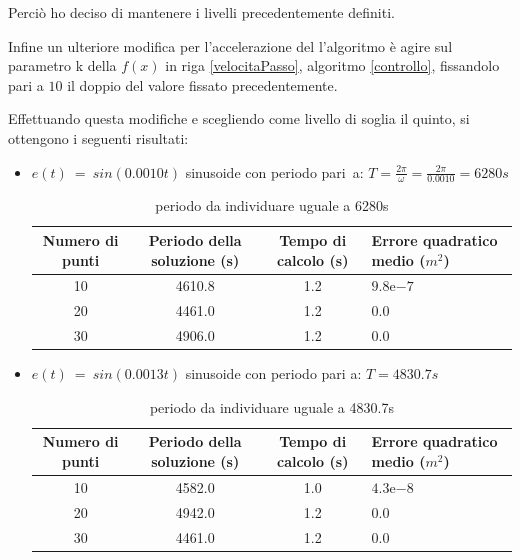 \documentclass[a4paper,12pt]{report}
\newcommand{\expnumber}[2]{{#1}\mathrm{e}{#2}}
\begin{document}
Perciò ho deciso di mantenere i livelli precedentemente definiti.

Infine un ulteriore modifica per l'accelerazione del l'algoritmo è agire sul parametro k della $f(x)$ in riga \ref{velocitaPasso}, algoritmo \ref{controllo}, fissandolo pari a $10$ il doppio del valore fissato precedentemente.

Effettuando questa modifiche e scegliendo come livello di soglia il quinto, si ottengono i seguenti risultati:
\begin{itemize}
  \item $ e(t)~=~sin(0.0010t)$ sinusoide con periodo pari~a: $T = \frac{2\pi}{\omega} = \frac{2\pi}{0.0010} = 6280s$
  \begin{table}[H]
    \caption{periodo da individuare uguale a 6280s}
    \label{tab:fuori_2}
    \begin{center}
      \begin{tabularx}{\textwidth}{SSSp{0.5\textwidth}}
        \toprule
        {Numero di punti} & {Periodo della soluzione (s)} & {Tempo di calcolo (s)} & {Errore quadratico \newline medio ($m^2$)}\\
        \midrule
        10 &  4610.8  & 1.2 & $\expnumber{9.8}{-7}$\\
        20 &  4461.0 & 1.2 & $0.0$\\
        30 &  4906.0 & 1.2 & $0.0$ \\
        \bottomrule
      \end{tabularx}
    \end{center}
  \end{table}


  \item $ e(t)~=~sin(0.0013t)$ sinusoide con periodo pari a:
  $T = 4830.7s$
  \begin{table}[H]
    \caption{periodo da individuare uguale a 4830.7s}
    \label{tab:limiteSup_2}
    \begin{center}
      \begin{tabularx}{\textwidth}{SSSp{0.5\textwidth}}
        \toprule
        {Numero di punti} & {Periodo della soluzione (s)} & {Tempo di calcolo (s)} & {Errore quadratico \newline medio ($m^2$)}\\
        \midrule
        10 &  4582.0  & 1.0 & $\expnumber{4.3}{-8}$\\
        20 &  4942.0 & 1.2 & $0.0$\\
        30 &  4461.0 & 1.2 & $0.0$\\
        \bottomrule
      \end{tabularx}
    \end{center}
  \end{table}



\end{itemize}
\end{document}
